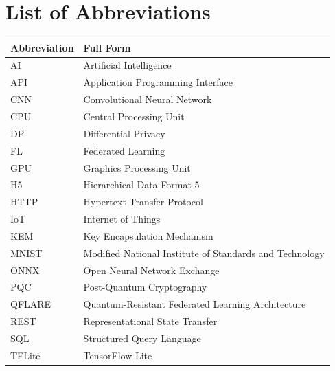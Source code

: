 \documentclass[12pt,a4paper]{article}
\begin{document}
\newpage
\listoffigures
\thispagestyle{plain}

\newpage
\listoftables
\thispagestyle{plain}

\newpage
\section*{List of Abbreviations}

\begin{table}[H]
\begin{tabular}{ll}
\textbf{Abbreviation} & \textbf{Full Form} \\
\toprule
AI & Artificial Intelligence \\
API & Application Programming Interface \\
CNN & Convolutional Neural Network \\
CPU & Central Processing Unit \\
DP & Differential Privacy \\
FL & Federated Learning \\
GPU & Graphics Processing Unit \\
H5 & Hierarchical Data Format 5 \\
HTTP & Hypertext Transfer Protocol \\
IoT & Internet of Things \\
KEM & Key Encapsulation Mechanism \\
MNIST & Modified National Institute of Standards and Technology \\
ONNX & Open Neural Network Exchange \\
PQC & Post-Quantum Cryptography \\
QFLARE & Quantum-Resistant Federated Learning Architecture \\
REST & Representational State Transfer \\
SQL & Structured Query Language \\
TFLite & TensorFlow Lite \\
\bottomrule
\end{tabular}
\end{table}

\newpage
{}
\setcounter{page}{1}
\end{document}
